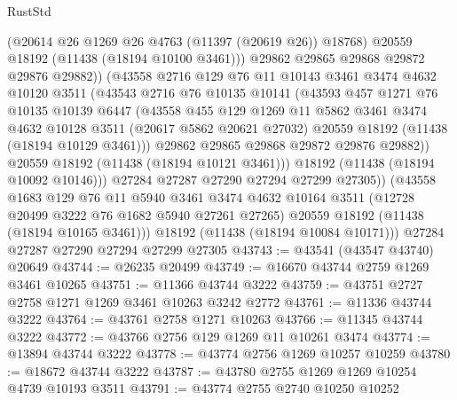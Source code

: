 \begin{lexlean}{RustStd}
\begin{coremodule}
                  (@20614 @26 @1269 @26 @4763 (@11397 (@20619 @26)) @18768)
                  @20559
                  @18192
                  (@11438 (@18194 @10100 @3461)))
                @29862
                @29865
                @29868
                @29872
                @29876
                @29882))
            (@43558
              @2716
              @129
              @76
              @11
              @10143
              @3461
              @3474
              @4632
              @10120
              @3511
              (@43543
                @2716
                @76
                @10135
                @10141
                (@43593
                  @457
                  @1271
                  @76
                  @10135
                  @10139
                  @6447
                  (@43558
                    @455
                    @129
                    @1269
                    @11
                    @5862
                    @3461
                    @3474
                    @4632
                    @10128
                    @3511
                    (@20617 @5862 @20621 @27032)
                    @20559
                    @18192
                    (@11438 (@18194 @10129 @3461)))
                  @29862
                  @29865
                  @29868
                  @29872
                  @29876
                  @29882))
              @20559
              @18192
              (@11438 (@18194 @10121 @3461)))
            @18192
            (@11438 (@18194 @10092 @10146)))
          @27284
          @27287
          @27290
          @27294
          @27299
          @27305))
      (@43558
        @1683
        @129
        @76
        @11
        @5940
        @3461
        @3474
        @4632
        @10164
        @3511
        (@12728 @20499 @3222 @76 @1682 @5940 @27261 @27265)
        @20559
        @18192
        (@11438 (@18194 @10165 @3461)))
      @18192
      (@11438 (@18194 @10084 @10171)))
    @27284
    @27287
    @27290
    @27294
    @27299
    @27305
@43743 := @43541 (@43547 @43740) @20649
@43744 := @26235 @20499
@43749 := @16670 @43744 @2759 @1269 @3461 @10265
@43751 := @11366 @43744 @3222
@43759 := @43751 @2727 @2758 @1271 @1269 @3461 @10263 @3242 @2772
@43761 := @11336 @43744 @3222
@43764 := @43761 @2758 @1271 @10263
@43766 := @11345 @43744 @3222
@43772 := @43766 @2756 @129 @1269 @11 @10261 @3474
@43774 := @13894 @43744 @3222
@43778 := @43774 @2756 @1269 @10257 @10259
@43780 := @18672 @43744 @3222
@43787 := @43780 @2755 @1269 @1269 @10254 @4739 @10193 @3511
@43791 := @43774 @2755 @2740 @10250 @10252

\end{coremodule}
\end{lexlean}

